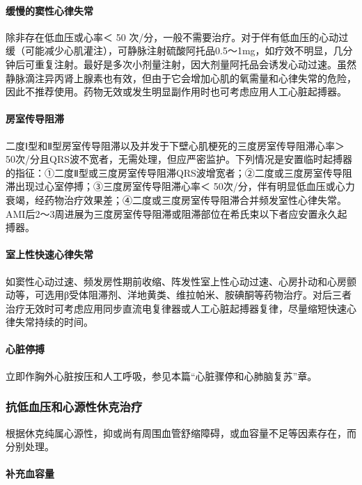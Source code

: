 \paragraph{缓慢的窦性心律失常}

除非存在低血压或心率＜ 50
次/分，一般不需要治疗。对于伴有低血压的心动过缓（可能减少心肌灌注），可静脉注射硫酸阿托品0.5～1mg，如疗效不明显，几分钟后可重复注射。最好是多次小剂量注射，因大剂量阿托品会诱发心动过速。虽然静脉滴注异丙肾上腺素也有效，但由于它会增加心肌的氧需量和心律失常的危险，因此不推荐使用。药物无效或发生明显副作用时也可考虑应用人工心脏起搏器。

\paragraph{房室传导阻滞}

二度Ⅰ型和Ⅱ型房室传导阻滞以及并发于下壁心肌梗死的三度房室传导阻滞心率＞
50次/分且QRS波不宽者，无需处理，但应严密监护。下列情况是安置临时起搏器的指征：①二度Ⅱ型或三度房室传导阻滞QRS波增宽者；②二度或三度房室传导阻滞出现过心室停搏；③三度房室传导阻滞心率＜
50次/分，伴有明显低血压或心力衰竭，经药物治疗效果差；④二度或三度房室传导阻滞合并频发室性心律失常。AMI后2～3周进展为三度房室传导阻滞或阻滞部位在希氏束以下者应安置永久起搏器。

\paragraph{室上性快速心律失常}

如窦性心动过速、频发房性期前收缩、阵发性室上性心动过速、心房扑动和心房颤动等，可选用β受体阻滞剂、洋地黄类、维拉帕米、胺碘酮等药物治疗。对后三者治疗无效时可考虑应用同步直流电复律器或人工心脏起搏器复律，尽量缩短快速心律失常持续的时间。

\paragraph{心脏停搏}

立即作胸外心脏按压和人工呼吸，参见本篇“心脏骤停和心肺脑复苏”章。

\subsubsection{抗低血压和心源性休克治疗}

根据休克纯属心源性，抑或尚有周围血管舒缩障碍，或血容量不足等因素存在，而分别处理。

\paragraph{补充血容量}


